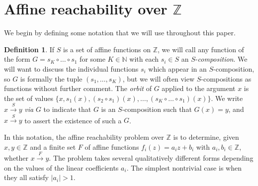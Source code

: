 \documentclass[11pt]{amsart}
\newcommand{\N}{\mathbb{N}}
\newcommand{\Z}{\mathbb{Z}}
\theoremstyle{definition}
\newtheorem*{definition}{Definition}
\theoremstyle{remark}
\begin{document}
\section{Affine reachability over $\Z$} \label{reach-z}

We begin by defining some notation that we will use throughout this paper.
\begin{definition}
If $S$ is a set of affine functions on $\Z$, we will call any function of the form $G = s_K \circ \dots \circ s_1$ for some $K \in \N$ with each $s_i \in S$ an $S$-\emph{composition}. We will want to discuss the individual functions $s_i$ which appear in an $S$-composition, so $G$ is formally the tuple $(s_1, \dots, s_K)$, but we will often view $S$-compositions as functions without further comment. The \emph{orbit} of $G$ applied to the argument $x$ is the set of values $\{x, s_1(x), (s_2 \circ s_1)(x), \dots, (s_K \circ \dots \circ s_1)(x) \}$. We write $x \xrightarrow{S} y$ \emph{via} $G$ to indicate that $G$ is an $S$-composition such that $G(x) = y$, and $x \xrightarrow{S} y$ to assert the existence of such a $G$.
\end{definition}
In this notation, the affine reachability problem over $\Z$ is to determine, given $x, y \in \Z$ and a finite set $F$ of affine functions $f_i(z) = a_i z + b_i$ with $a_i, b_i \in \Z$, whether $x \xrightarrow{F} y$. The problem takes several qualitatively different forms depending on the values of the linear coefficients $a_i$. The simplest nontrivial case is when they all satisfy $|a_i| > 1$. 
\end{document}
